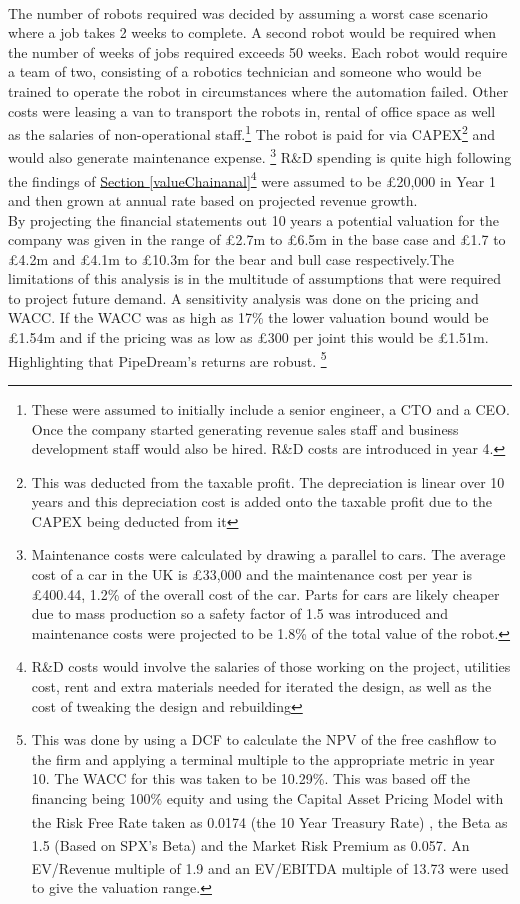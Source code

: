 \documentclass[11pt]{article}		%
\newcommand{\supercite}[1]{\textsuperscript{\cite{#1}}}		%
\newcommand{\sectref}[1]{\hyperref[#1]{Section \ref*{#1}}}     %
\begin{document}
\\ \hspace*{3ex}
The number of robots required was decided by assuming a worst case scenario where a job takes 2 weeks to complete. A second robot would be required when the number of weeks of jobs required exceeds 50 weeks. Each robot would require a team of two, consisting of a robotics technician and someone who would be trained to operate the robot in circumstances where the automation failed. Other costs were leasing a van to transport the robots in, rental of office space as well as the salaries of non-operational staff.\footnote{These were assumed to initially include a senior engineer, a CTO and a CEO. Once the company started generating revenue sales staff and business development staff would also be hired. R\&D costs are introduced in year 4.} The robot is paid for via CAPEX\footnote{This was deducted from the taxable profit. The depreciation is linear over 10 years and this depreciation cost is added onto the taxable profit due to the CAPEX being deducted from it} and would also generate maintenance expense. \footnote{Maintenance costs were calculated by drawing a parallel to cars. The average cost of a car in the UK is £33,000 and the maintenance cost per year is £400.44, 1.2\% of the overall cost of the car. Parts for cars are likely cheaper due to mass production so a safety factor of 1.5 was introduced and maintenance costs were projected to be 1.8\% of the total value of the robot.}  R\&D spending is quite high following the findings of \sectref{valueChainanal}\footnote{R\&D costs would involve the salaries of those working on the project, utilities cost, rent and extra materials needed for iterated the design, as well as the cost of tweaking the design and rebuilding} were assumed to be £20,000 in Year 1 and then grown at annual rate based on projected revenue growth.
\\ \hspace*{3ex}       	        
By projecting the financial statements out 10 years a potential valuation for the company was given in the range of £2.7m to £6.5m in the base case and £1.7 to £4.2m and £4.1m to £10.3m for the bear and bull case respectively.The limitations of this analysis is in the multitude of assumptions that were required to project future demand. A sensitivity analysis was done on the pricing and WACC. If the WACC was as high as 17\% the lower valuation bound would be £1.54m and if the pricing was as low as £300 per joint this would be £1.51m. Highlighting that PipeDream’s returns are robust. \footnote{This was done by using a DCF to calculate the NPV of the free cashflow to the firm and applying a terminal multiple to the appropriate metric in year 10. The WACC for this was taken to be 10.29\%. This was based off the financing being 100\% equity and using the Capital Asset Pricing Model with the Risk Free Rate taken as 0.0174 (the 10 Year Treasury Rate) \supercite{Treasury}, the Beta as 1.5 (Based on SPX’s Beta) \supercite{SPX_Beta} and the Market Risk Premium as 0.057\supercite{Risk_Premium}. An EV/Revenue multiple of 1.9 and an EV/EBITDA multiple of 13.73\supercite{SPX_multiple} were used to give the valuation range.}		        	        
		        	        
\end{document}

